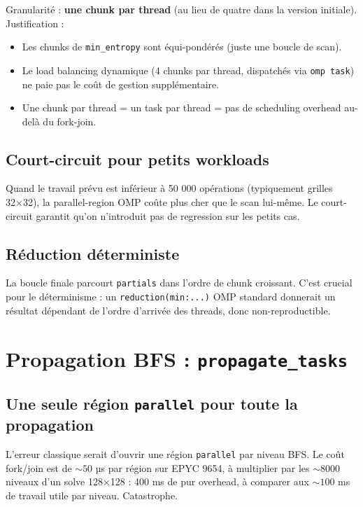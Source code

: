 Granularité : \textbf{une chunk par thread} (au lieu de quatre dans la version initiale). Justification :
\begin{itemize}
    \item Les chunks de \texttt{min\_entropy} sont équi-pondérés (juste une boucle de scan).
    \item Le load balancing dynamique (4 chunks par thread, dispatchés via \texttt{omp task}) ne paie pas le coût de gestion supplémentaire.
    \item Une chunk par thread = un task par thread = pas de scheduling overhead au-delà du fork-join.
\end{itemize}

\subsection{Court-circuit pour petits workloads}

Quand le travail prévu est inférieur à 50 000 opérations (typiquement grilles 32×32), la parallel-region OMP coûte plus cher que le scan lui-même. Le court-circuit garantit qu'on n'introduit pas de regression sur les petits cas.

\subsection{Réduction déterministe}

La boucle finale parcourt \texttt{partials} dans l'ordre de chunk croissant. C'est crucial pour le déterminisme : un \texttt{reduction(min:...)} OMP standard donnerait un résultat dépendant de l'ordre d'arrivée des threads, donc non-reproductible.

\section{Propagation BFS : \texttt{propagate\_tasks}}
\label{sec:omp:propagate}

\subsection{Une seule région \texttt{parallel} pour toute la propagation}

L'erreur classique serait d'ouvrir une région \texttt{parallel} par niveau BFS. Le coût fork/join est de $\sim 50$ µs par région sur EPYC 9654, à multiplier par les $\sim 8000$ niveaux d'un solve 128×128 : 400 ms de pur overhead, à comparer aux $\sim 100$ ms de travail utile par niveau. Catastrophe.

